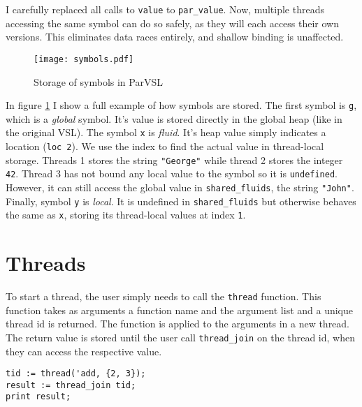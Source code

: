 I carefully replaced all calls to \texttt{value} to \texttt{par\_value}. Now, multiple threads accessing the same symbol
can do so safely, as they will each access their own versions. This eliminates data races entirely,
and shallow binding is unaffected.

\begin{figure}[H]
  \centering
  \texttt{[image: symbols.pdf]}
  \label{fig:symbols}
  \caption{Storage of symbols in ParVSL}
\end{figure}

In figure \ref{fig:symbols} I show a full example of how symbols are stored. The first symbol is \texttt{g}, which
is a \emph{global} symbol. It's value is stored directly in the global heap (like in the original VSL). The symbol \texttt{x}
is \emph{fluid}. It's heap value simply indicates a location (\texttt{loc 2}). We use the index to find the actual value
in thread-local storage. Threads 1 stores the string \texttt{"George"} while thread 2 stores the integer \texttt{42}.
Thread 3 has not bound any local value to the symbol so it is \texttt{undefined}. However, it can still access the
global value in \verb|shared_fluids|, the string \verb|"John"|. Finally, symbol \verb|y| is \emph{local}. It is
undefined in \verb|shared_fluids| but otherwise behaves the same as \verb|x|, storing its thread-local values at
index \verb|1|.


\section{Threads}
\label{sec:threads}

To start a thread, the user
simply needs to call the \texttt{thread} function. This function takes as arguments a function name and the argument list
and a unique thread id is returned. The function is applied to the arguments in a new thread. The return value
is stored until the user call \texttt{thread\_join} on the thread id, when they can access the respective value.

\begin{verbatim}
tid := thread('add, {2, 3});
result := thread_join tid;
print result;
\end{verbatim}

